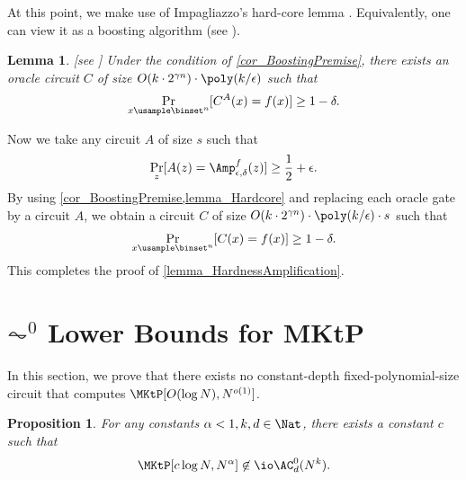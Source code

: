 \documentclass[11pt]{article}
\numberwithin{equation}{section}
\newtheorem{lemma}[theorem]{Lemma}
\newtheorem{proposition}[theorem]{Proposition}
\theoremstyle{definition}
\theoremstyle{plain}
\begin{document}
At this point, we make use of Impagliazzo's hard-core lemma \cite{Impagliazzo95_coco_conf}.
Equivalently, one can view it as a boosting algorithm
%
(see \cite{KlivansS03_ml_journals}).   %
\begin{lemma}
  [see   %
    \cite{Impagliazzo95_coco_conf, KlivansS03_ml_journals}]
  \label{lemma_Hardcore}
  Under the condition of \cref{cor_BoostingPremise},
  there exists an oracle circuit $C$ of size $O(k \cdot 2^{\gamma n}) \cdot \poly(k / \epsilon)$
  such that
  $$
    \Pr_{x \usample \binset^n} [ C^A(x) = f(x) ] \ge 1 - \delta.
  $$
\end{lemma}

Now we take any circuit $A$ of size $s$ such that
$$
  \Pr_{z} [  A(z) = \Amp_{\epsilon, \delta}^f(z) ] \ge \frac{1}{2} + \epsilon.
$$
By using \cref{cor_BoostingPremise,lemma_Hardcore}
and replacing each oracle gate by a circuit $A$,
we obtain a circuit $C$ of size $O(k \cdot 2^{\gamma n}) \cdot \poly(k / \epsilon) \cdot s$
such that
$$
  \Pr_{x \usample \binset^n} [ C(x) = f(x) ] \ge 1 - \delta.
$$
This completes the proof of \cref{lemma_HardnessAmplification}.


\section{\texorpdfstring{$\AC^0$}{AC0} Lower Bounds for MKtP}
\label{section_AC0MKtP}

In this section, we prove that there exists no constant-depth fixed-polynomial-size circuit that computes $\MKtP[O(\log N), N^{o(1)}]$.
\begin{proposition}
  \label{prop_AC0versusMKtP}
  For any constants $\alpha < 1, k, d \in \Nat$,
  there exists a constant $c$ such that
  $$\MKtP[c \log N, N^{\alpha}] \not\in \io \AC_d^0(N^k).$$
\end{proposition}
\end{document}
